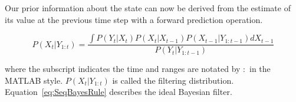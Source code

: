 Our prior information about the state can now be derived from the estimate of its value at the previous time step with a forward prediction operation.

\begin{equation}
P(X_t|Y_{1:t}) = \frac{\int P(Y_t|X_t)P(X_t|X_{t-1})P(X_{t-1}|Y_{1:t-1}) dX_{t-1}}{P(Y_t|Y_{1:t-1})}
\label{eq:SeqBayesRule}
\end{equation}

where the subscript indicates the time and ranges are notated by $:$ in the MATLAB style. $P(X_t|Y_{1:t})$ is called the filtering distribution. Equation~\ref{eq:SeqBayesRule} describes the ideal Bayesian filter.





